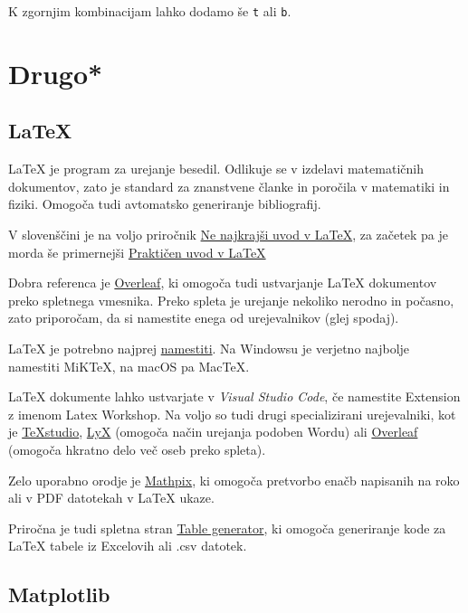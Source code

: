 \documentclass[
]{report}
\begin{document}
K zgornjim kombinacijam lahko dodamo še \texttt{t} ali \texttt{b}.

\hypertarget{drugo}{%
\chapter{Drugo*}\label{drugo}}

\hypertarget{latex}{%
\section{LaTeX}\label{latex}}

LaTeX je program za urejanje besedil. Odlikuje se v izdelavi matematičnih dokumentov, zato je standard za znanstvene članke in poročila v matematiki in fiziki. Omogoča tudi avtomatsko generiranje bibliografij.

V slovenščini je na voljo priročnik \href{https://users.fmf.uni-lj.si/plestenjak/Vaje/LaTeX/lshort.pdf}{Ne najkrajši uvod v LaTeX}, za začetek pa je morda še primernejši \href{https://e6.ijs.si/~jslak/files/prakticen_uvod_v_latex.pdf}{Praktičen uvod v LaTeX}

Dobra referenca je \href{https://www.overleaf.com/learn}{Overleaf}, ki omogoča tudi ustvarjanje LaTeX dokumentov preko spletnega vmesnika. Preko spleta je urejanje nekoliko nerodno in počasno, zato priporočam, da si namestite enega od urejevalnikov (glej spodaj).

LaTeX je potrebno najprej \href{https://www.latex-project.org/get/}{namestiti}. Na Windowsu je verjetno najbolje namestiti MiKTeX, na macOS pa MacTeX.

LaTeX dokumente lahko ustvarjate v \emph{Visual Studio Code}, če namestite Extension z imenom Latex Workshop. Na voljo so tudi drugi specializirani urejevalniki, kot je \href{https://www.texstudio.org}{TeXstudio}, \href{https://www.lyx.org}{LyX} (omogoča način urejanja podoben Wordu) ali \href{https://www.overleaf.com}{Overleaf} (omogoča hkratno delo več oseb preko spleta).

Zelo uporabno orodje je \href{https://mathpix.com}{Mathpix}, ki omogoča pretvorbo enačb napisanih na roko ali v PDF datotekah v LaTeX ukaze.

Priročna je tudi spletna stran \href{https://www.tablesgenerator.com}{Table generator}, ki omogoča generiranje kode za LaTeX tabele iz Excelovih ali .csv datotek.

\hypertarget{matplotlib}{%
\section{Matplotlib}\label{matplotlib}}
\end{document}

